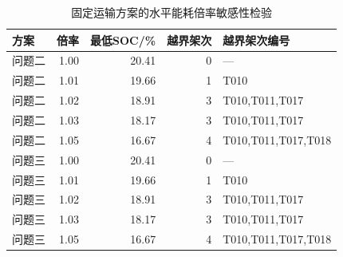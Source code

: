 \begin{table}[H]\centering\normalsize
\caption{固定运输方案的水平能耗倍率敏感性检验}\label{tab:energy_multiplier}
\begin{tabular}{lrrrl}
\toprule
方案 & 倍率 & 最低SOC/\% & 越界架次 & 越界架次编号\\\midrule
问题二 & 1.00 & 20.41 & 0 & ---\\
问题二 & 1.01 & 19.66 & 1 & T010\\
问题二 & 1.02 & 18.91 & 3 & T010,T011,T017\\
问题二 & 1.03 & 18.17 & 3 & T010,T011,T017\\
问题二 & 1.05 & 16.67 & 4 & T010,T011,T017,T018\\
问题三 & 1.00 & 20.41 & 0 & ---\\
问题三 & 1.01 & 19.66 & 1 & T010\\
问题三 & 1.02 & 18.91 & 3 & T010,T011,T017\\
问题三 & 1.03 & 18.17 & 3 & T010,T011,T017\\
问题三 & 1.05 & 16.67 & 4 & T010,T011,T017,T018\\
\bottomrule\end{tabular}
\end{table}
